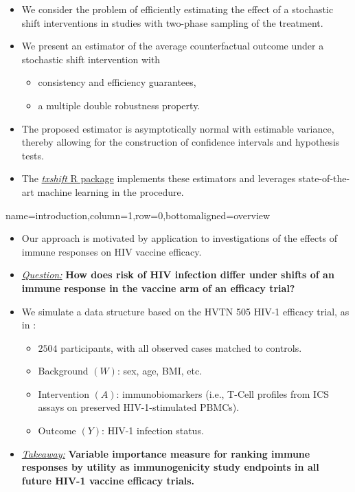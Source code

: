 \documentclass[landscape,a0paper,fontscale=0.285]{baposter} %
\newcommand{\compresslist}{ %
\setlength{\itemsep}{1pt}
\setlength{\parskip}{0pt}
\setlength{\parsep}{0pt}
}
\begin{document}
\begin{poster}
{\begin{itemize}\compresslist
\setlength\itemsep{0.75em}
\item We consider the problem of efficiently estimating the effect of a
 stochastic shift interventions in studies with two-phase sampling of the
 treatment.
\item We present an estimator of the average counterfactual outcome under a
  stochastic shift intervention with
  \begin{itemize}
    \item consistency and efficiency guarantees,
    \item a multiple double robustness property.
  \end{itemize}
\item The proposed estimator is asymptotically normal with estimable variance,
  thereby allowing for the construction of confidence intervals and hypothesis
  tests.
\item The \underline{\textit{txshift} R package} \cite{hejazi2018txshift}
  implements these estimators and leverages state-of-the-art machine learning in
  the procedure.
\end{itemize}
\vspace{0.65cm} %
}


{name=introduction,column=1,row=0,bottomaligned=overview}{

\begin{itemize}\compresslist
\setlength\itemsep{0.5em}
\item Our approach is motivated by application to investigations of the effects
  of immune responses on HIV vaccine efficacy.
\item \underline{\textit{Question:}} \textbf{How does risk of HIV infection
   differ under shifts of an immune response in the vaccine arm of an efficacy
   trial?}
\item We simulate a data structure based on the HVTN 505 HIV-1 efficacy trial,
  as in \cite{janes2017higher}:
  \begin{itemize}
    \itemsep0.25pt
    \item $2504$ participants, with all observed cases matched to controls.
    \item Background $(W)$: sex, age, BMI, etc.
    \item Intervention $(A)$: immunobiomarkers (i.e., T-Cell profiles from ICS
      assays on preserved HIV-1-stimulated PBMCs).
    \item Outcome $(Y)$: HIV-1 infection status.
  \end{itemize}
\item \underline{\textit{Takeaway:}} \textbf{Variable importance measure for
   ranking immune responses by utility as immunogenicity study endpoints in all
   future HIV-1 vaccine efficacy trials.}
\end{itemize}
}


\end{poster}
\end{document}
